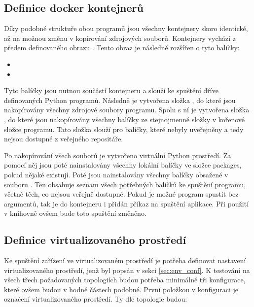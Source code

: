 \subsection{Definice docker kontejnerů}

Díky podobné struktuře obou programů jsou všechny kontejnery skoro identické, až na možnou změnu v kopírování zdrojových souborů. Kontejnery vychází z předem definovaného obrazu . Tento obraz je následně rozšířen o tyto balíčky:

\begin{itemize}
    \item {}
    \item {}
\end{itemize}

Tyto balíčky jsou nutnou součástí kontejneru a slouží ke spuštění dříve definovaných Python programů. Následně je vytvořena složka , do které jsou nakopírovány všechny zdrojové soubory programu. Spolu s ní je vytvořena složka , do které jsou nakopírovány všechny balíčky ze stejnojmenné složky v kořenové složce programu. Tato složka slouží pro balíčky, které nebyly uveřejněny a tedy nejsou dostupné z veřejného repositáře.

Po nakopírování všech souborů je vytvořeno virtuální Python prostředí. Za pomocí něj jsou poté nainstalovány všechny lokální balíčky ve složce packages, pokud nějaké existují. Poté jsou nainstalovány všechny balíčky obsažené v souboru . Ten obsahuje seznam všech potřebných balíčků ke spuštění programu, včetně těch, co nejsou veřejně dostupné. Pokud je možné program spustit bez argumentů, tak je do kontejneru i přidán příkaz na spuštění aplikace. Při použití v knihovně ovšem bude toto spuštění změněno. 

\subsection{Definice virtualizovaného prostředí}

Ke spuštění zařízení ve virtualizovaném prostředí je potřeba definovat nastavení virtualizovaného prostředí, jenž byl popsán v sekci \ref{sec:env_conf}. K testování na všech třech požadovaných topologiích budou potřeba minimálně tři konfigurace, které ovšem budou v hodně částech podobné. První položkou v konfiguraci je označení virtualizovaného prostředí. Ty dle topologie budou:

